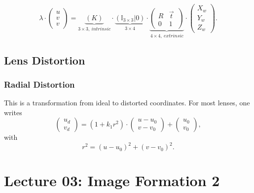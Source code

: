 \documentclass[a4paper,12 pt]{article}
\theoremstyle{definition}
\theoremstyle{remark}
\theoremstyle{definition}
\theoremstyle{definition}
\theoremstyle{definition}
\theoremstyle{remark}
\theoremstyle{definition}
\begin{document}
\begin{equation}
\lambda \cdot \begin{pmatrix}
u\\
v\\
v
\end{pmatrix}=\underbrace{(K)}_{3\times 3,\ intrinsic}\cdot \underbrace{(\mathbb{I}_{3\times 3}|0)}_{3\times 4}\cdot \underbrace{\begin{pmatrix}
 R&\vec{t} \ \\
 0&1
\end{pmatrix}}_{4\times 4, \ extrinsic}\cdot \begin{pmatrix}
X_w\\
Y_w\\
Z_w
\end{pmatrix}.
\end{equation}
\subsection*{Lens Distortion}
\subsubsection*{Radial Distortion}
This is a transformation from ideal to distorted coordinates. For most lenses, one writes
\begin{equation}
\begin{pmatrix}
u_d\\
v_d
\end{pmatrix}=(1+k_1r^2)\cdot \begin{pmatrix}
 u-u_0\\
 v-v_0
 \end{pmatrix}+\begin{pmatrix}
u_0\\
v_0
\end{pmatrix},
\end{equation}
with
\begin{equation}
r^2=(u-u_0)^2+(v-v_0)^2.
\end{equation}
\newpage
\section*{Lecture 03: Image Formation 2}
\end{document}
